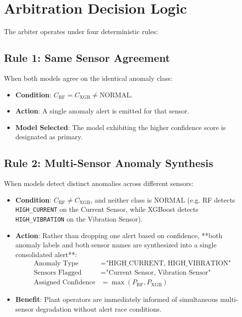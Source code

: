 \documentclass[12pt,a4paper]{report}
\begin{document}
\section{Arbitration Decision Logic}
The arbiter operates under four deterministic rules:

\subsection{Rule 1: Same Sensor Agreement}
When both models agree on the identical anomaly class:
\begin{itemize}
    \item \textbf{Condition}: $C_{\text{RF}} = C_{\text{XGB}} \neq \text{NORMAL}$.
    \item \textbf{Action}: A single anomaly alert is emitted for that sensor.
    \item \textbf{Model Selected}: The model exhibiting the higher confidence score is designated as primary.
\end{itemize}

\subsection{Rule 2: Multi-Sensor Anomaly Synthesis}
When models detect distinct anomalies across different sensors:
\begin{itemize}
    \item \textbf{Condition}: $C_{\text{RF}} \neq C_{\text{XGB}}$, and neither class is $\text{NORMAL}$ (e.g. RF detects \texttt{HIGH\_CURRENT} on the Current Sensor, while XGBoost detects \texttt{HIGH\_VIBRATION} on the Vibration Sensor).
    \item \textbf{Action}: Rather than dropping one alert based on confidence, **both anomaly labels and both sensor names are synthesized into a single consolidated alert**:
    \begin{align}
        \text{Anomaly Type} &= \text{"HIGH\_CURRENT, HIGH\_VIBRATION"} \\
        \text{Sensors Flagged} &= \text{"Current Sensor, Vibration Sensor"} \\
        \text{Assigned Confidence} &= \max(P_{\text{RF}}, P_{\text{XGB}})
    \end{align}
    \item \textbf{Benefit}: Plant operators are immediately informed of simultaneous multi-sensor degradation without alert race conditions.
\end{itemize}
\end{document}
